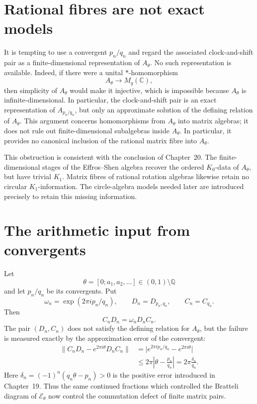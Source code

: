 \documentclass{book}
\begin{document}
\section{Rational fibres are not exact models}

It is tempting to use a convergent \(p_n/q_n\) and regard the associated
clock-and-shift pair as a finite-dimensional representation of \(A_\theta\).
No such representation is available.  Indeed, if there were a unital
\(*\)-homomorphism
\[
  A_\theta\longrightarrow M_q(\mathbb C),
\]
then simplicity of \(A_\theta\) would make it injective, which is
impossible because \(A_\theta\) is infinite-dimensional.  In particular,
the clock-and-shift pair is an exact representation of \(A_{p_n/q_n}\), but
only an approximate solution of the defining relation of \(A_\theta\).
This argument concerns homomorphisms from \(A_\theta\) into matrix algebras;
it does not rule out finite-dimensional subalgebras inside \(A_\theta\).
In particular, it provides no canonical inclusion of the rational matrix
fibre into \(A_\theta\).

This obstruction is consistent with the conclusion of Chapter~20.  The
finite-dimensional stages of the Effros--Shen algebra recover the ordered
\(K_0\)-data of \(A_\theta\), but have trivial \(K_1\).  Matrix fibres of
rational rotation algebras likewise retain no circular \(K_1\)-information.
The circle-algebra models needed later are introduced precisely to retain
this missing information.

\section{The arithmetic input from convergents}

Let
\[
  \theta=[0;a_1,a_2,\ldots]\in(0,1)\setminus\mathbb Q
\]
and let \(p_n/q_n\) be its convergents.  Put
\[
  \omega_n=\exp(2\pi i p_n/q_n),
  \qquad
  D_n=D_{p_n,q_n},
  \qquad
  C_n=C_{q_n}.
\]
Then
\[
  C_nD_n=\omega_nD_nC_n.
\]
The pair \((D_n,C_n)\) does not satisfy the defining relation for
\(A_\theta\), but the failure is measured exactly by the approximation
error of the convergent:
\begin{align*}
  \bigl\|C_nD_n-e^{2\pi i\theta}D_nC_n\bigr\|
    &=\bigl|e^{2\pi i p_n/q_n}-e^{2\pi i\theta}\bigr|\\
    &\leq 2\pi\left|\theta-\frac{p_n}{q_n}\right|
     =2\pi\frac{\delta_n}{q_n}.
\end{align*}
Here \(\delta_n=(-1)^n(q_n\theta-p_n)>0\) is the positive error introduced
in Chapter~19.  Thus the same continued fractions which controlled the
Bratteli diagram of \(\mathcal E_\theta\) now control the commutation defect
of finite matrix pairs.
\end{document}

